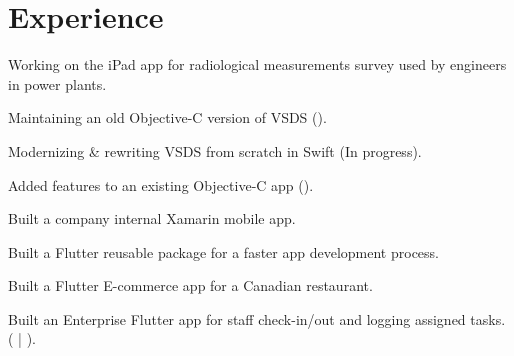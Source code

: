 \documentclass[]{Resume}
\begin{document}
\hfill
\begin{minipage}[t]{0.63\textwidth} 


\section{Experience}

\vspace{\topsep} %
\begin{tightemize}
\item Working on the  iPad app for radiological measurements survey used by engineers in power plants.
\item Maintaining an old Objective-C version of VSDS ().
\item Modernizing \& rewriting VSDS from scratch in Swift (In progress).
\end{tightemize}
\sectionsep

\begin{tightemize}
\item Added features to an existing Objective-C app ().
\item Built a company internal Xamarin mobile app.
\item Built a Flutter reusable package for a faster app development process.
\item Built a Flutter E-commerce app for a Canadian restaurant.
\item Built an Enterprise Flutter app for staff check-in/out and logging assigned tasks. ( | ).
\end{tightemize}
\sectionsep


\end{minipage}
\end{document}
